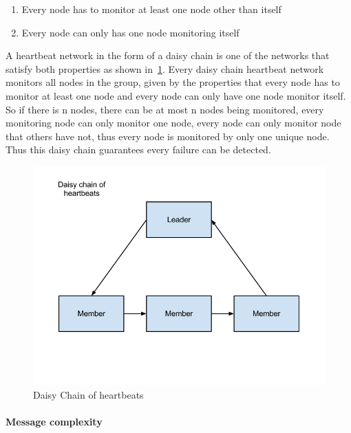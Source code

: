 \begin{enumerate}
\item Every node has to monitor at least one node other than itself
\item Every node can only has one node monitoring itself
\end{enumerate}


A heartbeat network in the form of a daisy chain is one of the networks that
satisfy both properties as shown in~\ref{fig:daisy-chain}. Every daisy chain
heartbeat network monitors all nodes in the group, given by the properties that
every node has to monitor at least one node and every node can only have one
node monitor itself. So if there is n nodes, there can be at most n nodes being
monitored, every monitoring node can only monitor one node, every node can only
monitor node that others have not, thus every node is monitored by only one
unique node. Thus this daisy chain guarantees every failure can be detected.

\begin{figure}[h!]
\label{fig:daisy-chain}
\caption{Daisy Chain of heartbeats}
\centering
    \includegraphics[width=\linewidth]{figures/daisy-chain}
\end{figure}

\paragraph{Message complexity}

